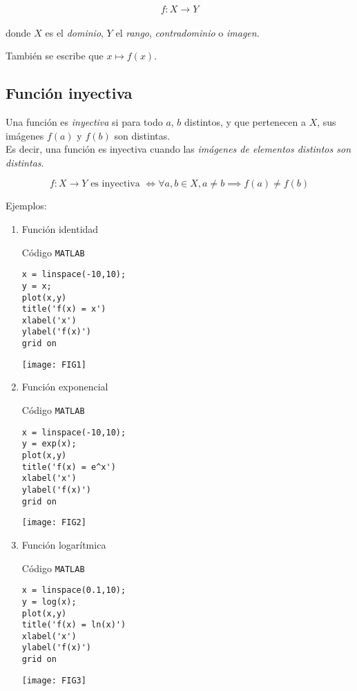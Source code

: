 \documentclass[a4paper,12pt]{article}
\begin{document}
\[	f: X \rightarrow Y\] \\

donde $X$ es el \emph{dominio}, $Y$ el \emph{rango}, \emph{contradominio} o \emph{imagen}.\par

También se escribe que $x \mapsto f(x)$.\par


\subsection*{Función inyectiva}

Una función es \emph{inyectiva} si para todo $a$, $b$ distintos, y que pertenecen a $X$, sus imágenes $f(a)$ y $f(b)$ son distintas. \\

Es decir, una función es inyectiva cuando las \textit{imágenes de elementos distintos son distintas}. \par

\[f : X \rightarrow Y \text{ es inyectiva } \iff \forall a, b \in X, a \neq b \implies f(a) \neq f(b) \]

Ejemplos:

\begin{enumerate}
	\centering
	\item Función identidad
		\begin{multicols}{2}
		Código \texttt{MATLAB}
		\begin{lstlisting}[style=Matlab-editor]
x = linspace(-10,10);
y = x;
plot(x,y)
title('f(x) = x')
xlabel('x')
ylabel('f(x)')
grid on
		\end{lstlisting}
		\columnbreak
			\texttt{[image: FIG1]}
		\end{multicols}
	
	\item Función exponencial
		\begin{multicols}{2}
		Código \texttt{MATLAB}
		\begin{lstlisting}[style=Matlab-editor]
x = linspace(-10,10);
y = exp(x);
plot(x,y)
title('f(x) = e^x')
xlabel('x')
ylabel('f(x)')
grid on
		\end{lstlisting}
		\columnbreak
			\texttt{[image: FIG2]}
		\end{multicols}

		\item Función logarítmica
		\begin{multicols}{2}
		Código \texttt{MATLAB}
		\begin{lstlisting}[style=Matlab-editor]
x = linspace(0.1,10);
y = log(x);
plot(x,y)
title('f(x) = ln(x)')
xlabel('x')
ylabel('f(x)')
grid on
		\end{lstlisting}
		\columnbreak
			\texttt{[image: FIG3]}
		\end{multicols}

\end{enumerate}
\end{document}
